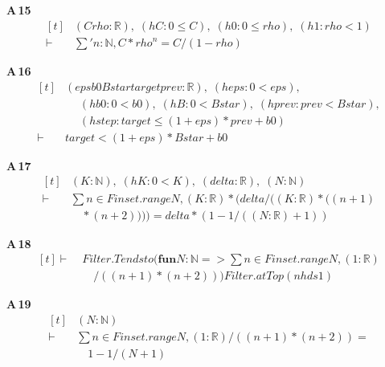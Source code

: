 \noindent\textbf{A\,15}\quad{}
{\footnotesize\[ \begin{aligned}[t]
&(\mathit{C} \mathit{rho} : \mathbb{R} ),\; (\mathit{hC} : 0 \leq \mathit{C}),\; (\mathit{h0} : 0 \leq \mathit{rho}),\; (\mathit{h1} : \mathit{rho} < 1)\\
\vdash\;&\textstyle\sum ' \mathit{n} : \mathbb{N} , \mathit{C} * \mathit{rho} ^{\mathit{n}} = \mathit{C} / (1 - \mathit{rho})
\end{aligned} \]}

\noindent\textbf{A\,16}\quad{}
{\footnotesize\[ \begin{aligned}[t]
&(\mathit{eps} \mathit{b0} \mathit{Bstar} \mathit{target} \mathit{prev} : \mathbb{R} ),\; (\mathit{heps} : 0 < \mathit{eps}),\\
&\quad \; (\mathit{hb0} : 0 < \mathit{b0}),\; (\mathit{hB} : 0 < \mathit{Bstar}),\; (\mathit{hprev} : \mathit{prev} < \mathit{Bstar}),\\
&\quad \; (\mathit{hstep} : \mathit{target} \leq (1 + \mathit{eps}) * \mathit{prev} + \mathit{b0})\\
\vdash\;&\mathit{target} < (1 + \mathit{eps}) * \mathit{Bstar} + \mathit{b0}
\end{aligned} \]}

\noindent\textbf{A\,17}\quad{}
{\footnotesize\[ \begin{aligned}[t]
&(\mathit{K} : \mathbb{N} ),\; (\mathit{hK} : 0 < \mathit{K}),\; (\mathit{delta} : \mathbb{R} ),\; (\mathit{N} : \mathbb{N} )\\
\vdash\;&\textstyle\sum \mathit{n} \in \mathit{Finset}.\mathit{range} \mathit{N}, (\mathit{K} : \mathbb{R} ) * (\mathit{delta} / ((\mathit{K} : \mathbb{R} ) * ((\mathit{n} + 1)\\
&\quad * (\mathit{n} + 2)))) = \mathit{delta} * (1 - 1 / ((\mathit{N} : \mathbb{R} ) + 1))
\end{aligned} \]}

\noindent\textbf{A\,18}\quad{}
{\footnotesize\[ \begin{aligned}[t]
\vdash\;&\mathit{Filter}.\mathit{Tendsto} (\mathbf{fun} \mathit{N} : \mathbb{N} => \textstyle\sum \mathit{n} \in \mathit{Finset}.\mathit{range} \mathit{N}, (1 : \mathbb{R} )\\
&\quad / ((\mathit{n} + 1) * (\mathit{n} + 2))) \mathit{Filter}.\mathit{atTop} (\mathit{nhds} 1)
\end{aligned} \]}

\noindent\textbf{A\,19}\quad{}
{\footnotesize\[ \begin{aligned}[t]
&(\mathit{N} : \mathbb{N} )\\
\vdash\;&\textstyle\sum \mathit{n} \in \mathit{Finset}.\mathit{range} \mathit{N}, (1 : \mathbb{R} ) / ((\mathit{n} + 1) * (\mathit{n} + 2)) =\\
&\quad 1 - 1 / (\mathit{N} + 1)
\end{aligned} \]}

